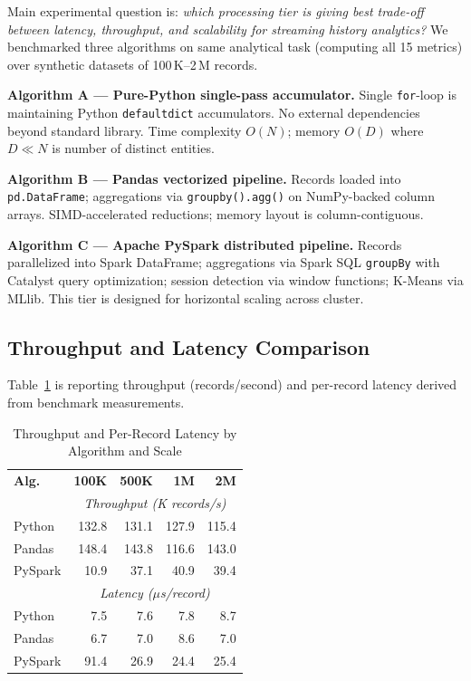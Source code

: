 \documentclass[conference]{IEEEtran}
\begin{document}
Main experimental question is: \emph{which processing tier is giving best trade-off between latency, throughput, and scalability for streaming history analytics?} We benchmarked three algorithms on same analytical task (computing all 15 metrics) over synthetic datasets of 100\,K--2\,M records.

\textbf{Algorithm A --- Pure-Python single-pass accumulator.}
Single \texttt{for}-loop is maintaining Python \texttt{defaultdict} accumulators. No external dependencies beyond standard library. Time complexity $O(N)$; memory $O(D)$ where $D \ll N$ is number of distinct entities.

\textbf{Algorithm B --- Pandas vectorized pipeline.}
Records loaded into \texttt{pd.DataFrame}; aggregations via \texttt{groupby().agg()} on NumPy-backed column arrays. SIMD-accelerated reductions; memory layout is column-contiguous.

\textbf{Algorithm C --- Apache PySpark distributed pipeline.}
Records parallelized into Spark DataFrame; aggregations via Spark SQL \texttt{groupBy} with Catalyst query optimization; session detection via window functions; K-Means via MLlib. This tier is designed for horizontal scaling across cluster.

\subsection{Throughput and Latency Comparison}

Table~\ref{tab:perf} is reporting throughput (records/second) and per-record latency derived from benchmark measurements.

\begin{table}[!t]
\caption{Throughput and Per-Record Latency by Algorithm and Scale}
\label{tab:perf}
\centering
\scriptsize
\setlength{\tabcolsep}{3pt}
\renewcommand{\arraystretch}{1.1}
\begin{tabular}{lrrrr}
\toprule
\textbf{Alg.} & \textbf{100K} & \textbf{500K} & \textbf{1M} & \textbf{2M} \\
              & \multicolumn{4}{c}{\textit{Throughput (K records/s)}} \\
\midrule
Python  & 132.8 & 131.1 & 127.9 & 115.4 \\
Pandas  & 148.4 & 143.8 & 116.6 & 143.0 \\
PySpark & 10.9  & 37.1  & 40.9  & 39.4  \\
\midrule
              & \multicolumn{4}{c}{\textit{Latency ($\mu$s/record)}} \\
\midrule
Python  & 7.5   & 7.6   & 7.8   & 8.7   \\
Pandas  & 6.7   & 7.0   & 8.6   & 7.0   \\
PySpark & 91.4  & 26.9  & 24.4  & 25.4  \\
\bottomrule
\end{tabular}
\end{table}
\end{document}
